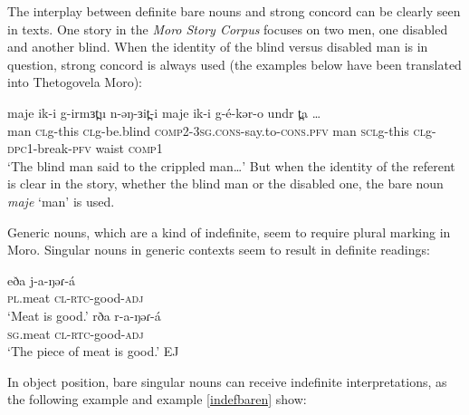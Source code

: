 The interplay between definite bare nouns and strong concord can be clearly seen in texts. One story in the \textit{Moro Story Corpus} focuses on two men, one disabled and another blind. When the identity of the blind versus disabled man is in question, strong concord is always used (the examples below have been translated into Thetogovela Moro):

\ea \gll maje ik-i g-irmɜt̪u n-əŋ-ɜit̪-i maje ik-i g-é-kər-o undr t̪a {\ldots}\\
	man \textsc{cl}g-this \textsc{cl}g-be.blind \textsc{comp}2-3\textsc{sg}.\textsc{cons}-say.to-\textsc{cons}.\textsc{pfv} man \textsc{scl}g-this \textsc{cl}g-\textsc{dpc}1-break-\textsc{pfv} waist \textsc{comp}1 {} \\
	\glt	`The blind man said to the crippled man\ldots'
\z 
But when the identity of the referent is clear in the story, whether the blind man or the disabled one, the bare noun \textit{maje} `man' is used.

Generic nouns, which are a kind of indefinite, seem to require plural marking in Moro. Singular nouns in generic contexts seem to result in definite readings:

\ea 
	\ea \gll  	eða		j-a-ŋəɾ-á\\
		\textsc{pl}.meat 	\textsc{cl}-\textsc{rtc}-good-\textsc{adj}\\
		\glt 	‘Meat is good.’
	\ex \gll rða		r-a-ŋəɾ-á \\
		\textsc{sg}.meat 	\textsc{cl}-\textsc{rtc}-good-\textsc{adj}\\
		\glt ‘The piece of meat is good.’  \hfill EJ
	\z
\z 

\ea 	
\z 
\z %

In object position, bare singular nouns can receive indefinite interpretations, as the following example and example \ref{indefbaren} show:

